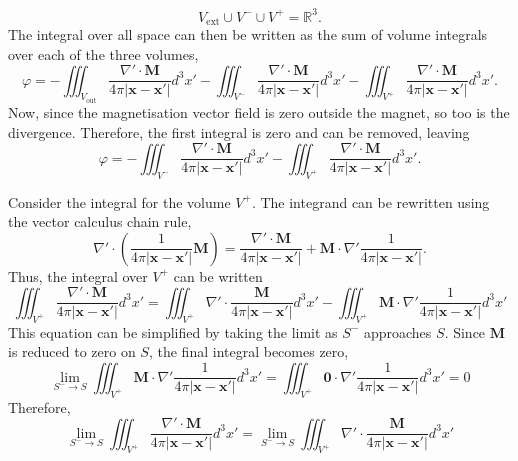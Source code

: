 \begin{equation}
    V_\text{ext} \cup V^- \cup V^+ = \mathbb{R}^3 \text{.}
\end{equation}
The integral over all space can then be written as the sum of volume integrals over each of the three volumes,
\begin{equation}
    \varphi = -\iiint_{V_\text{out}} \frac{\nabla' \cdot \mathbf{M}}{4\pi \left| \mathbf{x} - \mathbf{x}' \right|} d^3x' -\iiint_{V^-} \frac{\nabla' \cdot \mathbf{M}}{4\pi \left| \mathbf{x} - \mathbf{x}' \right|} d^3x' -\iiint_{V^+} \frac{\nabla' \cdot \mathbf{M}}{4\pi \left| \mathbf{x} - \mathbf{x}' \right|} d^3x' \text{.}
\end{equation}
Now, since the magnetisation vector field is zero outside the magnet, so too is the divergence. Therefore, the first integral is zero and can be removed, leaving
\begin{equation}
    \varphi = -\iiint_{V^-} \frac{\nabla' \cdot \mathbf{M}}{4\pi \left| \mathbf{x} - \mathbf{x}' \right|} d^3x' -\iiint_{V^+} \frac{\nabla' \cdot \mathbf{M}}{4\pi \left| \mathbf{x} - \mathbf{x}' \right|} d^3x' \text{.}
\end{equation}

Consider the integral for the volume \(V^+\). The integrand can be rewritten using the vector calculus chain rule,
\begin{equation}
    \nabla' \cdot \left( \frac{1}{4\pi \left| \mathbf{x} - \mathbf{x}' \right|} \mathbf{M} \right) = \frac{\nabla' \cdot \mathbf{M}}{4\pi \left| \mathbf{x} - \mathbf{x}' \right|} + \mathbf{M} \cdot \nabla' \frac{1}{4\pi \left| \mathbf{x} - \mathbf{x}' \right|} \text{.}
\end{equation}
Thus, the integral over \(V^+\) can be written
\begin{equation}
    \iiint_{V^+} \frac{\nabla' \cdot \mathbf{M}}{4\pi \left| \mathbf{x} - \mathbf{x}' \right|} d^3x' = \iiint_{V^+} \nabla' \cdot \frac{\mathbf{M}}{4\pi \left| \mathbf{x} - \mathbf{x}' \right|} d^3x' - \iiint_{V^+} \mathbf{M} \cdot \nabla' \frac{1}{4\pi \left| \mathbf{x} - \mathbf{x}' \right|} d^3x'
\end{equation}
This equation can be simplified by taking the limit as \(S^-\) approaches \(S\). Since \(\mathbf{M}\) is reduced to zero on \(S\), the final integral becomes zero,
\begin{equation}
    \lim_{S^- \to S} \iiint_{V^+} \mathbf{M} \cdot \nabla' \frac{1}{4\pi \left| \mathbf{x} - \mathbf{x}' \right|} d^3x' = \iiint_{V^+} \bm{0} \cdot \nabla' \frac{1}{4\pi \left| \mathbf{x} - \mathbf{x}' \right|} d^3x' = 0
\end{equation}
Therefore,
\begin{equation}
    \lim_{S^- \to S} \iiint_{V^+} \frac{\nabla' \cdot \mathbf{M}}{4\pi \left| \mathbf{x} - \mathbf{x}' \right|} d^3x' = \lim_{S^- \to S} \iiint_{V^+} \nabla' \cdot \frac{\mathbf{M}}{4\pi \left| \mathbf{x} - \mathbf{x}' \right|} d^3x'
\end{equation}


